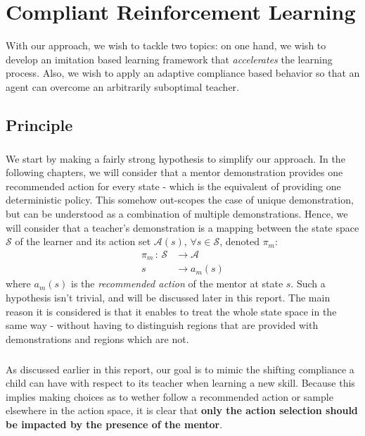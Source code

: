 \documentclass[a4paper]{report}
\begin{document}
	\chapter{Compliant Reinforcement Learning}
	{
		 With our approach, we wish to tackle two topics: on one hand, we wish to develop an imitation based learning framework that \emph{accelerates} the learning process. Also, we wish to apply an adaptive compliance based behavior so that an agent can overcome an arbitrarily suboptimal teacher.
		
		\section{Principle}
		{
			\paragraph{} We start by making a fairly strong hypothesis to simplify our approach. In the following chapters, we will consider that a mentor demonstration provides one recommended action for every state - which is the equivalent of providing one deterministic policy. This somehow out-scopes the case of unique demonstration, but can be understood as a combination of multiple demonstrations.\newline
			Hence, we will consider that a teacher's demonstration is a mapping between the state space $\mathcal{S}$ of the learner and its action set $\mathcal{A}(s)$, $\forall s\in\mathcal{S}$, denoted $\pi_m$: 
			\begin{equation}
				\begin{aligned}
					\pi_m \,:  \, \mathcal{S} &\to \mathcal{A}\\
						     s &\to a_m(s) 
				\end{aligned}
			\end{equation}
			where $a_m(s)$ is the \emph{recommended action} of the mentor at state $s$. 
			\newline 
			Such a hypothesis isn't trivial, and will be discussed later in this report. The main reason it is considered is that it enables to treat the whole state space in the same way - without having to distinguish regions that are provided with demonstrations and regions which are not. 
			
			\paragraph{} As discussed earlier in this report, our goal is to mimic the shifting compliance a child can have with respect to its teacher when learning a new skill. Because this implies making choices as to wether follow a recommended action or sample elsewhere in the action space, it is clear that \textbf{only the action selection should be impacted by the presence of the mentor}. 

}}
\end{document}
